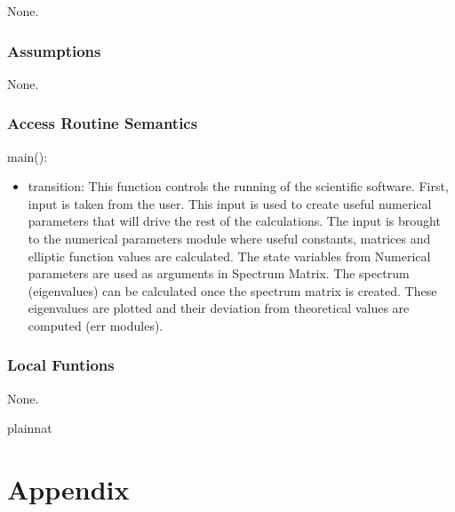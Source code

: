 \documentclass[12pt, titlepage]{article}
\begin{document}
None.

\subsubsection{Assumptions}

None.

\subsubsection{Access Routine Semantics}

\noindent main():
\begin{itemize}
	\item transition: This function controls the running of the scientific 
	software. First, input is taken from the user. This input is used to create 
	useful numerical parameters that will drive the rest of the calculations. 
	The input is brought to the numerical parameters module where useful 
	constants, matrices and elliptic function values are calculated. The state 
	variables from Numerical parameters are used as arguments in Spectrum 
	Matrix. The spectrum (eigenvalues) can be calculated once the spectrum 
	matrix is created. These eigenvalues are plotted and their deviation from 
	theoretical values are computed (err modules). 
\end{itemize}

\subsubsection{Local Funtions} 

None. 

\newpage 


 {plainnat}
 

\newpage

\section{Appendix} \label{Appendix}
\end{document}

